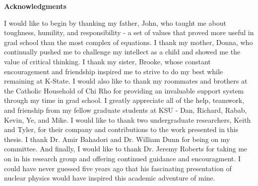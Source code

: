 
\newpage
\vspace*{0.9cm}
\begin{center}
{\bf \Huge Acknowledgments}
\end{center}

\setlength{\baselineskip}{0.8cm}



I would like to begin by thanking my father, John, who taught me about toughness, humility, and responsibility - a set of values that proved more useful in grad school than the most complex of equations.
I thank my mother, Donna, who continually pushed me to challenge my intellect as a child and showed me the value of critical thinking.
I thank my sister, Brooke, whose constant encouragement and friendship inspired me to strive to do my best while remaining at K-State.
I would also like to thank my roommates and brothers at the Catholic Household of Chi Rho for providing an invaluable support system through my time in grad school.
I greatly appreciate all of the help, teamwork, and frienship from my fellow graduate students at KSU - Dan, Richard, Rabab, Kevin, Ye, and Mike.
I would like to thank two undergraduate researchers, Keith and Tyler, for their company and contributions to the work presented in this thesis.
I thank Dr. Amir Bahadori and Dr. William Dunn for being on my committee.
And finally, I would like to thank Dr. Jeremy Roberts for taking me on in his research group and offering continued guidance and encouragment.
I could have never guessed five years ago that his fascinating presentation of nuclear physics would have inspired this academic adventure of mine.

